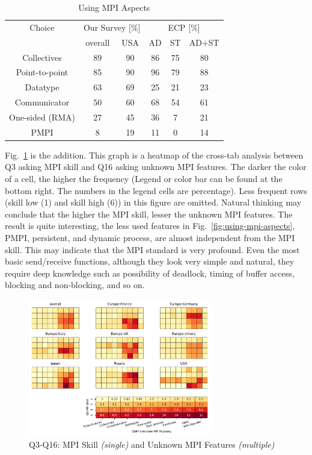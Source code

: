\documentclass[conference,10pt,letterpaper]{IEEEtran}
\begin{document}
\begin{table}[htb]%
\begin{center}%
\caption{Using MPI Aspects}\label{tab:using-mpi-aspects}%
\begin{tabular}{c||c|c||c|c|c}%
\hline%
Choice & \multicolumn{2}{c||}{Our Survey [\%]} &
\multicolumn{3}{c}{ECP [\%]} \\
\cline{2-6}%
 & overall & USA & AD & ST & AD+ST \\
\hline%
Collectives & 89 & 90 & 86 & 75 & 80 \\
Point-to-point & 85 & 90 & 96 & 79 & 88 \\
Datatype & 63 & 69 & 25 & 21 & 23 \\
Communicator & 50 & 60 & 68 & 54 & 61 \\
One-sided (RMA) & 27 & 45 & 36 & 7 & 21 \\
PMPI & 8 & 19 & 11 & 0 & 14 \\
\hline%
\end{tabular}%
\end{center}%
\end{table}%

Fig.~\ref{fig:skill-and-aspects} is the addition. This graph is a
heatmap of the cross-tab analysis between Q3 asking MPI skill and Q16
asking unknown MPI features. The darker the color of a cell, the
higher the frequency (Legend or color bar can be found at the bottom
right. The numbers in the legend cells are percentage). Less frequent
rows (skill low (1) and skill high (6)) in this figure are
omitted. Natural thinking may conclude 
that the higher the MPI skill, lesser the unknown MPI features. The
result is quite interesting, the less used features in
Fig.~\ref{fig:using-mpi-aspects}, PMPI, persistent, and dynamic
process, are almost independent from the MPI skill. This may indicate
that the MPI standard is very profound. Even the most basic
send/receive functions, although they look very simple and natural,
they require deep knowledge such as possibility of deadlock, timing of
buffer access, blocking and non-blocking, and so on.
  
\begin{figure}[htb]
\begin{center}
\includegraphics[width=8cm]{Figs/Q3-Q16.pdf}
\caption{Q3-Q16: MPI Skill {\it(single)} and Unknown MPI Features {\it(multiple)}}
\label{fig:skill-and-aspects}
\end{center}
\end{figure}
\end{document}
